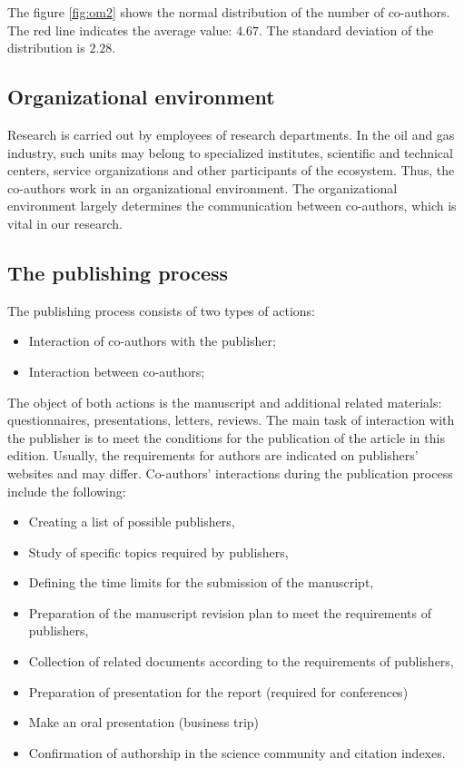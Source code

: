 \documentclass[12pt]{report}
\theoremstyle{definition}
\providecommand{\tightlist}{%
	\setlength{\itemsep}{0pt}\setlength{\parskip}{0pt}}
\begin{document}
The figure \ref{fig:om2} shows the normal distribution of the number of co-authors. The red line indicates the average value: $4.67$. 
The standard deviation of the distribution is $2.28$.

\subsection{Organizational environment}

Research is carried out by employees of research departments. 
In the oil and gas industry, such units may belong to specialized institutes, scientific and technical centers, service organizations and other participants of the ecosystem. 
Thus, the co-authors work in an organizational environment. 
The organizational environment largely determines the communication between co-authors, which is vital in our research.

\subsection{The publishing process}

The publishing process consists of two types of actions:
\begin{itemize}
	\tightlist
	\item Interaction of co-authors with the publisher;
	\item Interaction between co-authors;
\end{itemize}	

The object of both actions is the manuscript and additional related materials: questionnaires, presentations, letters, reviews.
The main task of interaction with the publisher is to meet the conditions for the publication of the article in this edition. 
Usually, the requirements for authors are indicated on publishers' websites and may differ.  
Co-authors' interactions during the publication process include the following:

\begin{itemize}
	\tightlist
	\item Creating a list of possible publishers,
	\item Study of specific topics required by publishers,
	\item Defining the time limits for the submission of the manuscript,
	\item Preparation of the manuscript revision plan to meet the requirements of publishers,
	\item Collection of related documents according to the requirements of publishers,
	\item Preparation of presentation for the report (required for conferences)
	\item Make an oral presentation (business trip)
	\item Confirmation of authorship in the science community and citation indexes.
\end{itemize}
\end{document}
